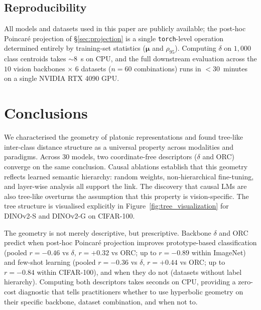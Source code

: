 \documentclass{article}
\begin{document}
\subsection{Reproducibility}
\label{sec:reproducibility}

All models and datasets used in this paper are publicly available; the post-hoc Poincar\'{e} projection of \S\ref{sec:projection} is a single \texttt{torch}-level operation determined entirely by training-set statistics ($\boldsymbol\mu$ and $\rho_{95}$). Computing $\delta$ on $1{,}000$ class centroids takes ${\sim}8$~s on CPU, and the full downstream evaluation across the $10$ vision backbones $\times$ $6$ datasets ($n = 60$ combinations) runs in $<\!30$~minutes on a single NVIDIA RTX 4090 GPU.

\FloatBarrier

\section{Conclusions}
\label{sec:conclusion}



We characterised the geometry of platonic representations and found tree-like inter-class distance structure as a universal property across modalities and paradigms. Across 30 models, two coordinate-free descriptors ($\delta$ and ORC) converge on the same conclusion. Causal ablations establish that this geometry reflects learned semantic hierarchy: random weights, non-hierarchical fine-tuning, and layer-wise analysis all support the link. The discovery that causal LMs are also tree-like overturns the assumption that this property is vision-specific. The tree structure is visualised explicitly in Figure~\ref{fig:tree_visualization} for DINOv2-S and DINOv2-G on CIFAR-100.

The geometry is not merely descriptive, but prescriptive. Backbone $\delta$ and ORC predict when post-hoc Poincar\'{e} projection improves prototype-based classification (pooled $r = -0.46$ vs $\delta$, $r = +0.32$ vs ORC; up to $r = -0.89$ within ImageNet) and few-shot learning (pooled $r = -0.36$ vs $\delta$, $r = +0.44$ vs ORC; up to $r = -0.84$ within CIFAR-100), and when they do not (datasets without label hierarchy). Computing both descriptors takes seconds on CPU, providing a zero-cost diagnostic that tells practitioners whether to use hyperbolic geometry on their specific backbone, dataset combination, and when not to.
\end{document}
